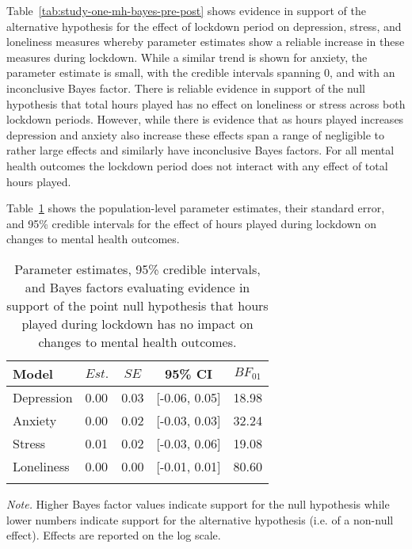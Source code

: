 \documentclass[
  english,
  man,floatsintext]{apa6}
\begin{document}
Table~\ref{tab:study-one-mh-bayes-pre-post} shows evidence in support of the alternative hypothesis for the effect of lockdown period on depression, stress, and loneliness measures whereby parameter estimates show a reliable increase in these measures during lockdown. While a similar trend is shown for anxiety, the parameter estimate is small, with the credible intervals spanning 0, and with an inconclusive Bayes factor. There is reliable evidence in support of the null hypothesis that total hours played has no effect on loneliness or stress across both lockdown periods. However, while there is evidence that as hours played increases depression and anxiety also increase these effects span a range of negligible to rather large effects and similarly have inconclusive Bayes factors. For all mental health outcomes the lockdown period does not interact with any effect of total hours played.

Table~\ref{tab:study-one-mh-bayes-l-diff} shows the population-level parameter estimates, their standard error, and 95\% credible intervals for the effect of hours played during lockdown on changes to mental health outcomes.

\begin{table}[!htbp]

\begin{center}
\begin{threeparttable}

\caption{\label{tab:study-one-mh-bayes-l-diff}Parameter estimates, 95\% credible intervals, and Bayes factors evaluating evidence in support of the point null hypothesis that hours played during lockdown has no impact on changes to mental health outcomes.}

\begin{tabular}{lllll}
\toprule
Model & \multicolumn{1}{c}{$Est.$} & \multicolumn{1}{c}{$SE$} & \multicolumn{1}{c}{95\% CI} & \multicolumn{1}{c}{$BF_{01}$}\\
\midrule
Depression & 0.00 & 0.03 & {}[-0.06, 0.05] & 18.98\\
Anxiety & 0.00 & 0.02 & {}[-0.03, 0.03] & 32.24\\
Stress & 0.01 & 0.02 & {}[-0.03, 0.06] & 19.08\\
Loneliness & 0.00 & 0.00 & {}[-0.01, 0.01] & 80.60\\
\bottomrule
\addlinespace
\end{tabular}

\begin{tablenotes}[para]
\normalsize{\textit{Note.} Higher Bayes factor values indicate support for the null hypothesis while lower numbers indicate support for the alternative hypothesis (i.e. of a non-null effect). Effects are reported on the log scale.}
\end{tablenotes}

\end{threeparttable}
\end{center}

\end{table}
\end{document}
